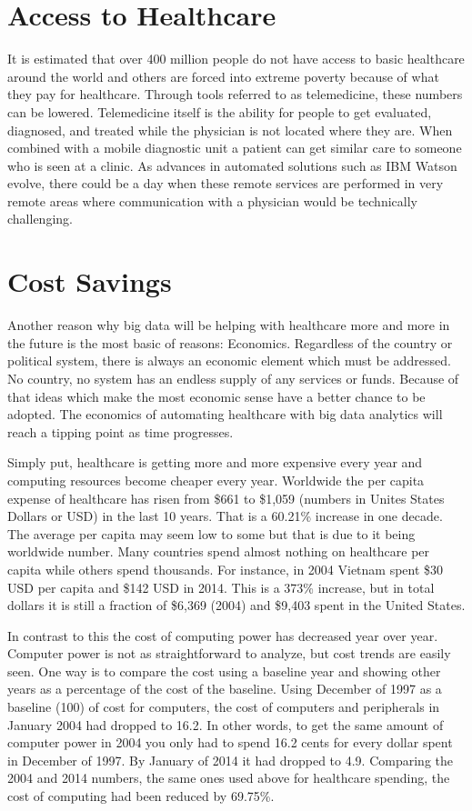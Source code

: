 \documentclass[sigconf]{acmart}
\begin{document}
\section{Access to Healthcare}
It is estimated that over 400 million people do not have access to 
basic healthcare around the world and others are forced into extreme 
poverty because of what they pay for healthcare\cite{Who400}.  
Through tools referred to as telemedicine, these numbers can be 
lowered.  Telemedicine itself is the ability for people to get 
evaluated, diagnosed, and treated while the physician is not located 
where they are.  When combined with a mobile diagnostic unit a 
patient can get similar care to someone who is seen at a 
clinic\cite{WhoRemote}.  As advances in automated solutions such as 
IBM Watson evolve, there could be a day when these remote services 
are performed in very remote areas where communication with a 
physician would be technically challenging.

\section{Cost Savings}
Another reason why big data will be helping with healthcare more and 
more in the future is the most basic of reasons:  Economics.  
Regardless of the country or political system, there is always an 
economic element which must be addressed.  No country, no system has 
an endless supply of any services or funds.   Because of that ideas 
which make the most economic sense have a better chance to be 
adopted.  The economics of automating healthcare with big data 
analytics will reach a tipping point as time progresses.

Simply put, healthcare is getting more and more expensive every year 
and computing resources become cheaper every year.  Worldwide the per 
capita expense of healthcare has risen from \$661 to \$1,059 (numbers 
in Unites States Dollars or USD) in the last 10 
years\cite{WoldBankPerCapita}. That is a 60.21\% increase in one 
decade.  The average per capita may seem low to some but that is due 
to it being worldwide number.  Many countries spend almost nothing 
on healthcare per capita while others spend thousands.  For instance, 
in 2004 Vietnam spent \$30 USD per capita and \$142 USD in 2014.  
This is a 373\% increase, but in total dollars it is still a fraction 
of \$6,369 (2004) and \$9,403 spent in the United 
States\cite{WoldBankPerCapita}.  

In contrast to this the cost of computing power has decreased year 
over year.  Computer power is not as straightforward to analyze, but 
cost trends are easily seen.  One way is to compare the cost using 
a baseline year and showing other years as a percentage of the cost 
of the baseline.  Using December of 1997 as a baseline (100) of cost 
for computers, the cost of computers and peripherals in January 2004 
had dropped to 16.2.  In other words, to get the same amount of 
computer power in 2004 you only had to spend 16.2 cents for every 
dollar spent in December of 1997.  By January of 2014 it had dropped 
to 4.9.  Comparing the 2004 and 2014 numbers, the same ones used above 
for healthcare spending, the cost of computing had been reduced by 
69.75\%\cite{CompPrices}.  
\end{document}
